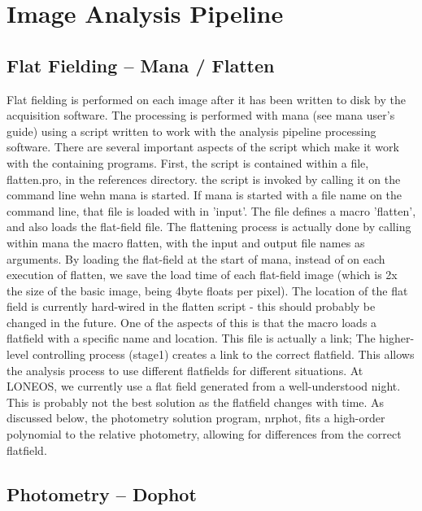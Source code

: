 \documentclass{article}
\begin{document}
\section{Image Analysis Pipeline}
\label{parallel}
\subsection{Flat Fielding -- Mana / Flatten}

Flat fielding is performed on each image after it has been written to
disk by the acquisition software.  The processing is performed with
mana (see mana user's guide) using a script written to work with the
analysis pipeline processing software.  There are several important
aspects of the script which make it work with the containing programs.
First, the script is contained within a file, flatten.pro, in the
references directory.  the script is invoked by calling it on the
command line wehn mana is started.  If mana is started with a file
name on the command line, that file is loaded with in 'input'.  The
file defines a macro 'flatten', and also loads the flat-field file.
The flattening process is actually done by calling within mana the
macro flatten, with the input and output file names as arguments.  By
loading the flat-field at the start of mana, instead of on each
execution of flatten, we save the load time of each flat-field image
(which is 2x the size of the basic image, being 4byte floats per
pixel).  The location of the flat field is currently hard-wired in the
flatten script - this should probably be changed in the future.  One
of the aspects of this is that the macro loads a flatfield with a
specific name and location.  This file is actually a link; The
higher-level controlling process (stage1) creates a link to the
correct flatfield.  This allows the analysis process to use different
flatfields for different situations.  At LONEOS, we currently use a
flat field generated from a well-understood night.  This is probably
not the best solution as the flatfield changes with time.  As
discussed below, the photometry solution program, nrphot, fits a
high-order polynomial to the relative photometry, allowing for
differences from the correct flatfield.
 
\subsection{Photometry -- Dophot}
\end{document}
